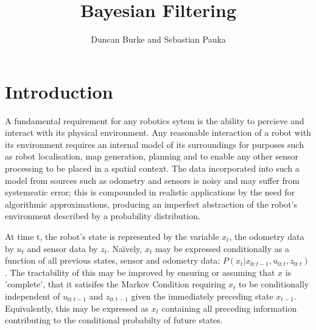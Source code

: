 \documentclass[english]{article}
\begin{document}
\title{Bayesian Filtering}

\author{Duncan Burke and Sebastian Pauka}
\maketitle


\section*{Introduction}

A fundamental requirement for any robotics sytem is the ability to percieve and interact with its physical environment. Any reasonable interaction of a robot with its environment requires an internal model of its surroundings for purposes such as robot localisation, map generation, planning and to enable any other sensor processing to be placed in a spatial context. The data incorporated into such a model from sources such as odometry and sensors is noisy and may suffer from systemeatic error; this is compounded in realistic applications by the need for algorithmic approximations, producing an imperfect abstraction of the robot's environment described by a probability distribution.


At time t, the robot's state is represented by the variable $x_t$, the odometry data by $u_t$ and sensor data by $z_t$. Na\"{i}vely, $x_t$ may be expressed conditionally as a function of all previous states, sensor and odometry data: $P(x_t | x_{0:t-1}, u_{0:t}, z_{0:t})$. The tractability of this may be improved by ensuring or assuming that $x$ is 'complete', that it satisifes the Markov Condition requiring $x_t$ to be conditionally independent of $u_{0:t-1}$ and $z_{0:t-1}$ given the immediately preceding state $x_{t-1}$. Equivalently, this may be expressed as $x_t$ containing all preceding information contributing to the conditional probabilty of future states.
\end{document}
